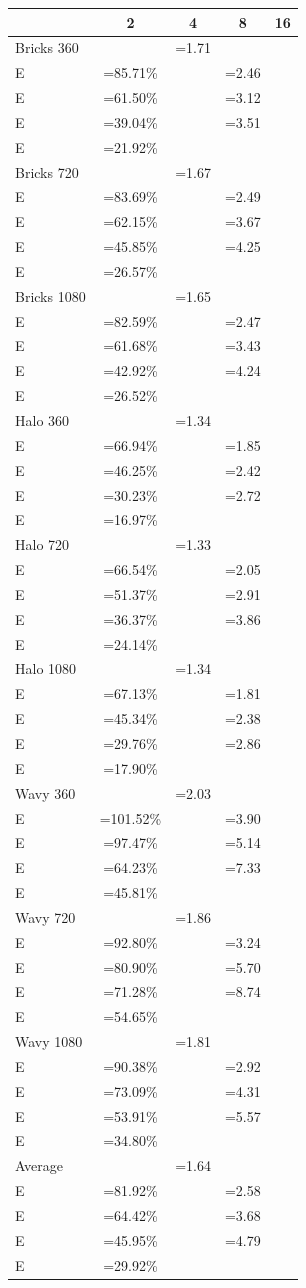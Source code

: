 \newcommand{\SE}[2]{\footnotesize \(\begin{aligned}S&=#1\times \\[-5pt] E&=#2\% \end{aligned}\)}
\begin{tabular}{l|c c c c}
&2&4&8&16\\
\hline
Bricks 360&\SE{1.71}{85.71}&\SE{2.46}{61.50}&\SE{3.12}{39.04}&\SE{3.51}{21.92}\\
Bricks 720&\SE{1.67}{83.69}&\SE{2.49}{62.15}&\SE{3.67}{45.85}&\SE{4.25}{26.57}\\
Bricks 1080&\SE{1.65}{82.59}&\SE{2.47}{61.68}&\SE{3.43}{42.92}&\SE{4.24}{26.52}\\
Halo 360&\SE{1.34}{66.94}&\SE{1.85}{46.25}&\SE{2.42}{30.23}&\SE{2.72}{16.97}\\
Halo 720&\SE{1.33}{66.54}&\SE{2.05}{51.37}&\SE{2.91}{36.37}&\SE{3.86}{24.14}\\
Halo 1080&\SE{1.34}{67.13}&\SE{1.81}{45.34}&\SE{2.38}{29.76}&\SE{2.86}{17.90}\\
Wavy 360&\SE{2.03}{101.52}&\SE{3.90}{97.47}&\SE{5.14}{64.23}&\SE{7.33}{45.81}\\
Wavy 720&\SE{1.86}{92.80}&\SE{3.24}{80.90}&\SE{5.70}{71.28}&\SE{8.74}{54.65}\\
Wavy 1080&\SE{1.81}{90.38}&\SE{2.92}{73.09}&\SE{4.31}{53.91}&\SE{5.57}{34.80}\\
Average&\SE{1.64}{81.92}&\SE{2.58}{64.42}&\SE{3.68}{45.95}&\SE{4.79}{29.92}\\
\end{tabular}